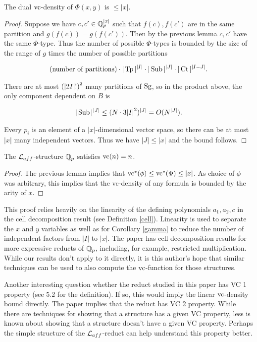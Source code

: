 \begin{Corollary}
  The dual $\operatorname{vc}$-density of $\Phi(x,y)$ is $\leq |x|$.
\end{Corollary}

\begin{proof}
  Suppose we have $c, c' \in \mathbb{Q}_p^{|x|}$ such that $f(c), f(c')$ are in the same partition and $g(f(c)) = g(f(c'))$.
  Then by the previous lemma $c, c'$ have the same $\Phi$-type.
  Thus the number of possible $\Phi$-types is bounded by the size of the range of $g$ times the number of possible partitions
  
  \begin{align*}
    \text{(number of partitions)} \cdot |\operatorname{Tp}|^{|I|} \cdot |\operatorname{Sub}|^{|J|} \cdot |\operatorname{Ct}|^{|I-J|}.
  \end{align*}

  There are at most $\left(|2I|!\right)^2$ many partitions of $\operatorname{Sg}$,
  so in the product above, the only component dependent on $B$ is

  \begin{align*}
    |\operatorname{Sub}|^{|J|} \leq (N \cdot 3{|I|}^2)^{|J|} = O(N^{|J|}).
  \end{align*}	
  
  Every $p_i$ is an element of a $|x|$-dimensional vector space, so there can be at most $|x|$ many independent vectors.
  Thus we have $|J| \leq |x|$ and the bound follows.
\end{proof}

\begin{Corollary} 
  The $\mathcal L_{aff}$-structure $\mathbb{Q}_p$ satisfies $\operatorname{vc}(n) = n$.
\end{Corollary}

\begin{proof}
  The previous lemma implies that $\operatorname{vc}^*(\phi) \leq \operatorname{vc}^*(\Phi) \leq |x|$.
  As choice of $\phi$ was arbitrary, this implies that the vc-density of any formula is bounded by the arity of $x$.
\end{proof}

This proof relies heavily on the linearity of the defining polynomials $a_1, a_2, c$ in the cell decomposition result (see Definition \ref{cell}).
Linearity is used to separate the $x$ and $y$ variables as well as
for Corollary \ref{gamma} to reduce the number of independent factors from $|I|$ to $|x|$.
The paper \cite{reduct} has cell decomposition results for more expressive reducts of $\mathbb{Q}_p$,
including, for example, restricted multiplication.
While our results don't apply to it directly,
it is this author's hope that similar techniques can be used to also compute the $\operatorname{vc}$-function for those structures.

Another interesting question whether the reduct studied in this paper has VC 1 property (see \cite{density} 5.2 for the definition).
If so, this would imply the linear $\operatorname{vc}$-density bound directly.
The paper \cite{density} implies that the reduct has VC 2 property.
While there are techniques for showing that a structure has a given VC property,
less is known about showing that a structure doesn't have a given VC property.
Perhaps the simple structure of the $\mathcal L_{aff}$-reduct can help understand this property better.


